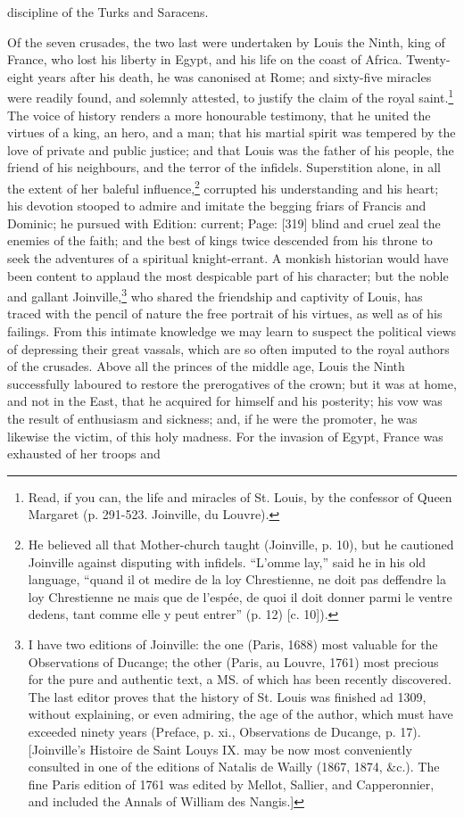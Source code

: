 discipline of the Turks and Saracens.

Of the seven crusades, the two last were undertaken by Louis the Ninth, king of France, who lost his liberty in Egypt, and his life on the coast of Africa. Twenty-eight years after his death, he was canonised at Rome; and sixty-five miracles were readily found, and solemnly attested, to justify the claim of the royal saint.\footnote{Read, if you can, the life and miracles of St. Louis, by the confessor of Queen Margaret (p. 291-523. Joinville, du Louvre).} The voice of history renders a more honourable testimony, that he united the virtues of a king, an hero, and a man; that his martial spirit was tempered by the love of private and public justice; and that Louis was the father of his people, the friend of his neighbours, and the terror of the infidels. Superstition alone, in all the extent of her baleful influence,\footnote{He believed all that Mother-church taught (Joinville, p. 10), but he cautioned Joinville against disputing with infidels. \texthebrew{“}L\texthebrew{}’omme lay,\texthebrew{}” said he in his old language, \texthebrew{“}quand il ot medire de la loy Chrestienne, ne doit pas deffendre la loy Chrestienne ne mais que de l\texthebrew{}’espée, de quoi il doit donner parmi le ventre dedens, tant comme elle y peut entrer\texthebrew{}” (p. 12) [c. 10]).} corrupted his understanding and his heart; his devotion stooped to admire and imitate the begging friars of Francis and Dominic; he pursued with Edition: current; Page: [319] blind and cruel zeal the enemies of the faith; and the best of kings twice descended from his throne to seek the adventures of a spiritual knight-errant. A monkish historian would have been content to applaud the most despicable part of his character; but the noble and gallant Joinville,\footnote{I have two editions of Joinville: the one (Paris, 1688) most valuable for the Observations of Ducange; the other (Paris, au Louvre, 1761) most precious for the pure and authentic text, a MS. of which has been recently discovered. The last editor proves that the history of St. Louis was finished ad 1309, without explaining, or even admiring, the age of the author, which must have exceeded ninety years (Preface, p. xi., Observations de Ducange, p. 17). [Joinville\texthebrew{}’s Histoire de Saint Louys IX. may be now most conveniently consulted in one of the editions of Natalis de Wailly (1867, 1874, \&c.). The fine Paris edition of 1761 was edited by Mellot, Sallier, and Capperonnier, and included the Annals of William des Nangis.]} who shared the friendship and captivity of Louis, has traced with the pencil of nature the free portrait of his virtues, as well as of his failings. From this intimate knowledge we may learn to suspect the political views of depressing their great vassals, which are so often imputed to the royal authors of the crusades. Above all the princes of the middle age, Louis the Ninth successfully laboured to restore the prerogatives of the crown; but it was at home, and not in the East, that he acquired for himself and his posterity; his vow was the result of enthusiasm and sickness; and, if he were the promoter, he was likewise the victim, of this holy madness. For the invasion of Egypt, France was exhausted of her troops and 